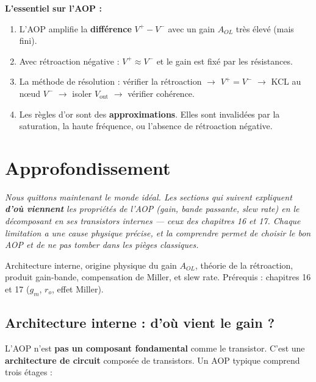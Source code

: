 \documentclass[12pt,a4paper,twoside]{book}
\begin{document}
\begin{retenir}
\textbf{L'essentiel sur l'AOP :}
\begin{enumerate}[nosep]
\item L'AOP amplifie la \textbf{différence} $V^+ - V^-$ avec un gain $A_{OL}$ très élevé (mais fini).
\item Avec rétroaction négative : $V^+ \approx V^-$ et le gain est fixé par les résistances.
\item La méthode de résolution : vérifier la rétroaction $\to$ $V^+ = V^-$ $\to$ KCL au n\oe ud $V^-$ $\to$ isoler $V_{\text{out}}$ $\to$ vérifier cohérence.
\item Les règles d'or sont des \textbf{approximations}. Elles sont invalidées par la saturation, la haute fréquence, ou l'absence de rétroaction négative.
\end{enumerate}
\end{retenir}

\section{Approfondissement}

\vspace{0.3cm}
\textit{Nous quittons maintenant le monde idéal. Les sections qui suivent expliquent \textbf{d'où viennent} les propriétés de l'AOP (gain, bande passante, slew rate) en le décomposant en ses transistors internes --- ceux des chapitres 16 et 17. Chaque limitation a une cause physique précise, et la comprendre permet de choisir le bon AOP et de ne pas tomber dans les pièges classiques.}
\vspace{0.3cm}

\begin{approfondissement}
Architecture interne, origine physique du gain $A_{OL}$, théorie de la rétroaction, produit gain-bande, compensation de Miller, et slew rate. Prérequis : chapitres 16 et 17 ($g_m$, $r_o$, effet Miller).
\end{approfondissement}

\subsection{Architecture interne : d'où vient le gain ?}

L'AOP n'est \textbf{pas un composant fondamental} comme le transistor. C'est une \textbf{architecture de circuit} composée de transistors. Un AOP typique comprend trois étages :
\end{document}
